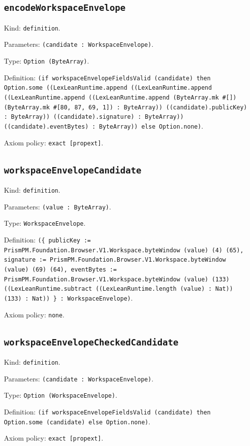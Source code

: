 \documentclass[11pt]{article}
\begin{document}
\subsection*{\texttt{encodeWorkspaceEnvelope}}
\noindent Kind: \texttt{definition}.\par
\noindent Parameters: \texttt{(candidate : WorkspaceEnvelope)}.\par
\noindent Type: \texttt{Option (ByteArray)}.\par
\noindent Definition: \texttt{(if workspaceEnvelopeFieldsValid (candidate) then Option.some ((LexLeanRuntime.append ((LexLeanRuntime.append ((LexLeanRuntime.append ((LexLeanRuntime.append (ByteArray.mk \#[]) (ByteArray.mk \#[80, 87, 69, 1]) : ByteArray)) ((candidate).publicKey) : ByteArray)) ((candidate).signature) : ByteArray)) ((candidate).eventBytes) : ByteArray)) else Option.none)}.\par
\noindent Axiom policy: \texttt{exact [propext]}.\par
\subsection*{\texttt{workspaceEnvelopeCandidate}}
\noindent Kind: \texttt{definition}.\par
\noindent Parameters: \texttt{(value : ByteArray)}.\par
\noindent Type: \texttt{WorkspaceEnvelope}.\par
\noindent Definition: \texttt{(\{ publicKey := PrismPM.Foundation.Browser.V1.Workspace.byteWindow (value) (4) (65), signature := PrismPM.Foundation.Browser.V1.Workspace.byteWindow (value) (69) (64), eventBytes := PrismPM.Foundation.Browser.V1.Workspace.byteWindow (value) (133) ((LexLeanRuntime.subtract ((LexLeanRuntime.length (value) : Nat)) (133) : Nat)) \} : WorkspaceEnvelope)}.\par
\noindent Axiom policy: \texttt{none}.\par
\subsection*{\texttt{workspaceEnvelopeCheckedCandidate}}
\noindent Kind: \texttt{definition}.\par
\noindent Parameters: \texttt{(candidate : WorkspaceEnvelope)}.\par
\noindent Type: \texttt{Option (WorkspaceEnvelope)}.\par
\noindent Definition: \texttt{(if workspaceEnvelopeFieldsValid (candidate) then Option.some (candidate) else Option.none)}.\par
\noindent Axiom policy: \texttt{exact [propext]}.\par
\end{document}
